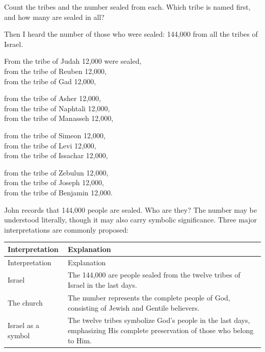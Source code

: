 \begin{ScriptureBox2}{Count the tribes and the number sealed from each. Which tribe is named first, and how many are sealed in all?}

\item[7:4] Then I heard the number of those who were sealed: 144,000 from all the tribes of Israel.

\item[7:5] From the tribe of Judah 12,000 were sealed,\\
from the tribe of Reuben 12,000,\\
from the tribe of Gad 12,000,

\item[7:6] from the tribe of Asher 12,000,\\
from the tribe of Naphtali 12,000,\\
from the tribe of Manasseh 12,000,

\item[7:7] from the tribe of Simeon 12,000,\\
from the tribe of Levi 12,000,\\
from the tribe of Issachar 12,000,

\item[7:8] from the tribe of Zebulun 12,000,\\
from the tribe of Joseph 12,000,\\
from the tribe of Benjamin 12,000.

\end{ScriptureBox2}

John records that 144,000 people are sealed. Who are they? The number may be understood literally, though it may also carry symbolic significance. Three major interpretations are commonly proposed:

{
\small
\renewcommand{\arraystretch}{1}
\begin{longtable}{>{\raggedright\arraybackslash}p{2.4cm}
                  >{\raggedright\arraybackslash}p{6.6cm}}
\hline
Interpretation & Explanation \\
\hline
\endfirsthead

\hline
Interpretation & Explanation \\
\hline
\endhead

\endfoot

\endlastfoot

Israel &
The 144,000 are people sealed from the twelve tribes of Israel in the last days. \\
\hline
The church  &
The number represents the complete people of God, consisting of Jewish and Gentile believers. \\
\hline
Israel as a symbol &
The twelve tribes symbolize God's people in the last days, emphasizing His complete preservation of those who belong to Him. \\
\hline
\end{longtable}
}

